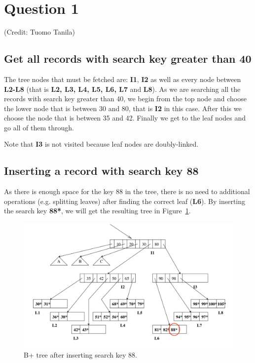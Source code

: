 \section{Question 1}\label{question-1}

(Credit: Tuomo Tanila)

\subsection{Get all records with search key greater than 40}\label{section}

The tree nodes that must be fetched are: \textbf{I1}, \textbf{I2} as well as every node between \textbf{L2-L8} (that is \textbf{L2, L3, L4, L5, L6, L7} and \textbf{L8}). As we are searching all the records with search key greater than 40, we begin from the top node and choose the lower node that is between 30 and 80, that is \textbf{I2} in this case. After this we choose the node that is between 35 and 42. Finally we get to the leaf nodes and go all of them through.

Note that \textbf{I3} is not visited because leaf nodes are doubly-linked. 


\subsection{Inserting a record with search key 88}\label{section-1}

As there is enough space for the key 88 in the tree, there is no need to additional operations (e.g. splitting leaves) after finding the correct leaf (\textbf{L6}). By inserting the search key \textbf{88*}, we will get the resulting tree in Figure~\ref{fig:q1-1}.

\begin{figure}[H]
  \centering
  \includegraphics[width=0.9\linewidth]{figs/q1-2.png}
  \caption{B+ tree after inserting search key 88.}
  \label{fig:q1-1}
\end{figure}

